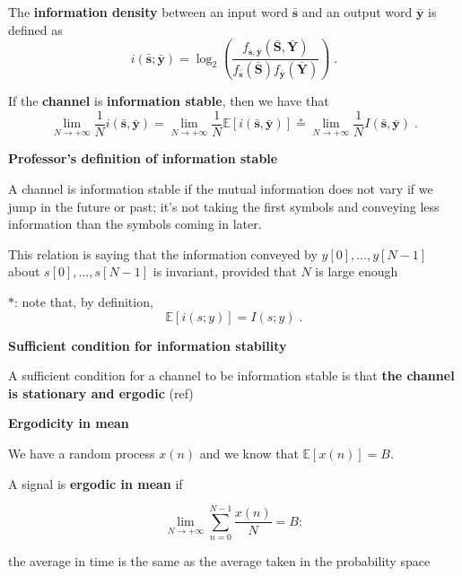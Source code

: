 \documentclass[a4paper, 11pt]{book}
\begin{document}
The \textbf{information density} between an input word $\bar{\bm{s}}$ and an output word $\bar{\bm{y}}$ is defined as
$$
i(\bar{\bm{s}}; \bar{\bm{y}}) = \log_2 \left( \frac{f_{\bar{\bm{s}}, \bar{\bm{y}}}(\bar{\bm{S}}, \bar{\bm{Y}})}{f_{\bar{\bm{s}}}(\bar{\bm{S}}) f_{\bar{\bm{y}}}(\bar{\bm{Y}})} \right) \;.
$$

If the \textbf{channel} is \textbf{information stable}, then we have that
$$
\lim_{N \to +\infty} \frac{1}{N} i(\bar{\bm{s}}, \bar{\bm{y}}) = \lim_{N \to +\infty} \frac{1}{N} \mathbb{E}[i(\bar{\bm{s}}, \bar{\bm{y}})] \stackrel{*}{=} \lim_{N \to +\infty} \frac{1}{N} I(\bar{\bm{s}}, \bar{\bm{y}}) \;.
$$

\begin{tcolorbox}[colframe=blue!60!cyan, colback=white, boxrule=1pt, arc=2pt]
    \textcolor{blue!80!cyan}{\textbf{\small {} Professor's definition of information stable}}

    A channel is information stable if the mutual information does not vary if we jump in the future or past; it's not taking the first symbols and conveying less information than the symbols coming in later.
\end{tcolorbox}

\vspace{1em}

This relation is saying that the information conveyed by $y[0], \dots, y[N-1]$ about $s[0], \dots, s[N-1]$ is invariant, provided that $N$ is large enough

$*$: note that, by \textcolor{green!60!black}{definition},
$$
\mathbb{E}[i(s;y)] = I(s;y) \;.
$$

\begin{tcolorbox}[colframe=cyan!80!blue, colback=white, boxrule=1pt, arc=2pt]
    \textbf{\small {} Sufficient condition for information stability}

    A sufficient condition for a channel to be information stable is that \textbf{the channel is stationary and ergodic} \textcolor{green!60!black}{(ref)}

    \vspace{0.5em}

    \begin{tcolorbox}[colframe=blue!60!cyan, colback=white, boxrule=1pt, arc=2pt]
        \textbf{\small {} Ergodicity in mean}

        We have a random process $x(n)$ and we know that $\mathbb{E}[x(n)] = B$.

        A signal is \textbf{ergodic in mean} if
        
        $$
        \lim_{N \to +\infty} \sum_{n=0}^{N-1} \frac{x(n)}{N} = B :
        $$
        
        the average in time is the same as the average taken in the probability space
    \end{tcolorbox}
\end{tcolorbox}
\end{document}
